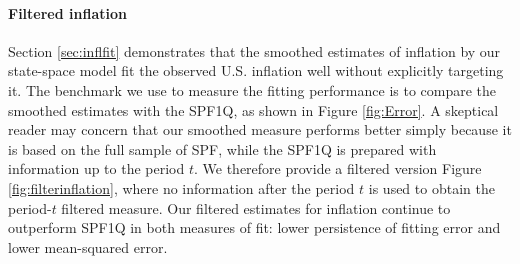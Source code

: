 \documentclass[12pt,letter,leqno]{article}
\theoremstyle{asn}
\theoremstyle{lem}
\theoremstyle{slem}
\theoremstyle{prop}
\theoremstyle{appprop}
\theoremstyle{rem}
\theoremstyle{defn}
\begin{document}

\paragraph{Filtered inflation}
Section \ref{sec:inflfit} demonstrates that the smoothed estimates of inflation by our state-space model fit the observed U.S. inflation well without explicitly targeting it. The benchmark we use to measure the fitting performance is to compare the smoothed estimates with the SPF1Q, as shown in Figure \ref{fig:Error}. A skeptical reader may concern that our smoothed measure performs better simply because it is based on the full sample of SPF, while the SPF1Q is prepared with information up to the period $t$. We therefore provide a filtered version Figure \ref{fig:filterinflation}, where no information after the period $t$ is used to obtain the period-$t$ filtered measure. Our filtered estimates for inflation continue to outperform SPF1Q in both measures of fit: lower persistence of fitting error and lower mean-squared error.
\end{document}
